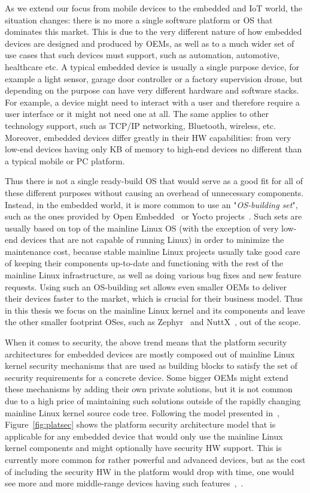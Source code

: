 As we extend our focus from mobile devices to the embedded and IoT world, the situation changes: there is no more a single software platform or OS that dominates this market. This is due to the very different nature of how embedded devices are designed and produced by OEMs, as well as to a much wider set of use cases that such devices must support, such as automation, automotive, healthcare etc. A typical embedded device is usually a single purpose device, for example a light sensor, garage door controller or a factory supervision drone, but depending on the purpose can have very different hardware and software stacks. For example, a device might need to interact with a user and therefore require a user interface or it might not need one at all. The same applies to other technology support, such as TCP/IP networking, Bluetooth, wireless, etc. Moreover, embedded devices differ greatly in their HW capabilities: from very low-end devices having only KB of memory to high-end devices no different than a typical mobile or PC platform.

Thus there is not a single ready-build OS that would serve as a good fit for all of these different purposes without causing an overhead of unnecessary components. Instead, in the embedded world, it is more common to use an "\textit{OS-building set}", such as the ones provided by Open Embedded~\cite{OE2017} or Yocto projects~\cite{yocto2017}. Such sets are usually based on top of the mainline Linux OS (with the exception of very low-end devices that are not capable of running Linux) in order to minimize the maintenance cost, because stable mainline Linux projects usually take good care of keeping their components up-to-date and functioning with the rest of the mainline Linux infrastructure, as well as doing various bug fixes and new feature requests. Using such an OS-building set allows even smaller OEMs to deliver their devices faster to the market, which is crucial for their business model. Thus in this thesis we focus on the mainline Linux kernel and its components and leave the other smaller footprint OSes, such as Zephyr~\cite{zephyr} and NuttX~\cite{NuttX}, out of the scope. 

When it comes to security, the above trend means that the platform security architectures for embedded devices are mostly composed out of mainline Linux kernel security mechanisms that are used as building blocks to satisfy the set of security requirements for a concrete device. Some bigger OEMs might extend these mechanisms by adding their own private solutions, but it is not common due to a high price of maintaining such solutions outside of the rapidly changing mainline Linux kernel source code tree. Following the model presented in~\cite{2013Asokan}, Figure~\ref{fig:platsec} shows the platform security architecture model that is applicable for any embedded device that would only use the mainline Linux kernel components and might optionally have security HW support. This is currently more common for rather powerful and advanced devices, but as the cost of including the security HW in the platform would drop with time, one would see more and more middle-range devices having such features~\cite{marketresearch},~\cite{iothwsecurity}. 


